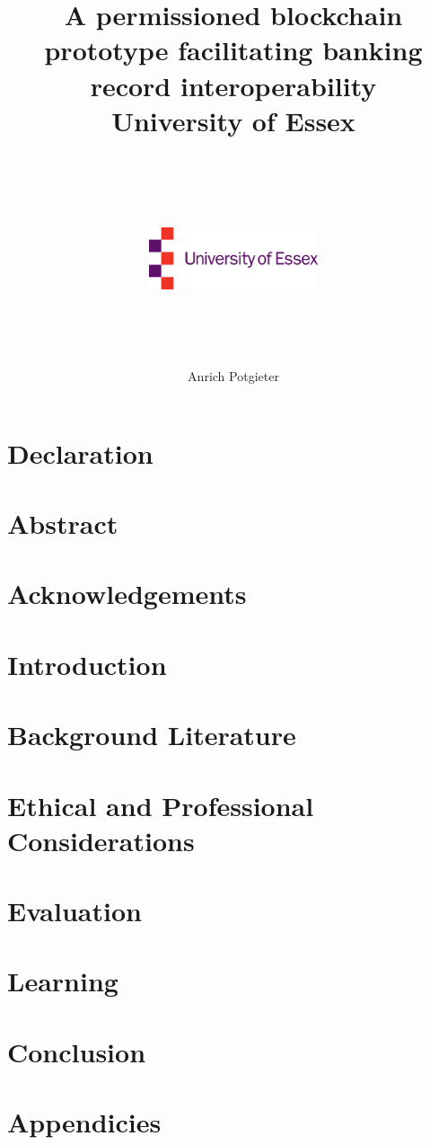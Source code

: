 \documentclass[12pt]{report}
\title{
    {A permissioned blockchain prototype facilitating banking record interoperability}\\
    {\large University of Essex}\\~\\
    {\includegraphics[width=5cm,height=5cm,keepaspectratio]{university.jpg}}
    }
\author{Anrich Potgieter}
\begin{document}
    
    \maketitle
    
    \chapter*{Declaration}
    

    \chapter*{Abstract}

    \chapter*{Acknowledgements}

    \tableofcontents

    \chapter{Introduction}

    \chapter{Background Literature}
    

    \chapter{Ethical and Professional Considerations}

    \chapter{Evaluation}

    \chapter{Learning}

    \chapter{Conclusion}

    \printbibliography

    \appendix
    \chapter{Appendicies}
\end{document}
